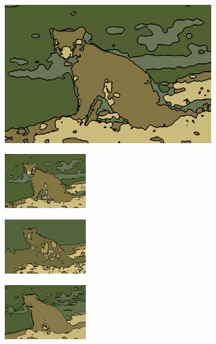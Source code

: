 \documentclass[journal]{IEEEtran}
\begin{document}
\begin{figure}[!t]
    
    \begin{subfigure}[b]{\textwidth+20pt\relax}
    	\centering
    	\includegraphics[width=\dimexpr\linewidth-20pt\relax]{160067_KMeans_const_segm_HSV} 
    \end{subfigure}      
    \begin{subfigure}[b]{0.23\textwidth}
    	\centering
        \includegraphics[height=67.68857pt]{160067_MiniBatchKMeans_const_segm_HSV}
    \end{subfigure}
    \begin{subfigure}[b]{0.23\textwidth}
    	\centering
        \includegraphics[height=67.68857pt]{160067_Birch_const_segm_LAB}
    \end{subfigure}
    \begin{subfigure}[b]{0.23\textwidth}
    	\centering
        \includegraphics[height=67.68857pt]{160067_GaussianMixture_const_segm_HSV}
    \end{subfigure} \\ \vspace{-5pt}  
    

\end{figure}
\end{document}
